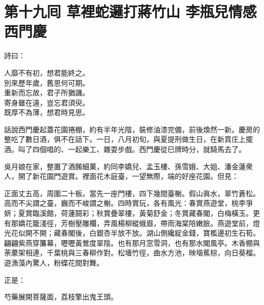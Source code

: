 
\chapter*{第十九囘 草裡蛇邏打蔣竹山 李瓶兒情感西門慶}


詩曰：

\begin{myquote}
人靡不有初，想君能終之。\\別來歷年歲，舊恩何可期。\\重新而忘故，君子所猶譏。\\寄身雖在遠，豈忘君須臾。\\既厚不為薄，想君時見思。
\end{myquote}

話說西門慶起蓋花園捲棚，約有半年光陰，裝修油漆完備，前後煥然一新。慶房的整吃了數日酒，俱不在話下。一日，八月初旬，與夏提刑做生日，在新買庄上擺酒。叫了四個唱的、一起樂工、雜耍步戲。西門慶從巳牌時分，就騎馬去了。

吳月娘在家，整置了酒餚細菓，約同李嬌兒、孟玉樓、孫雪娥、大姐、潘金蓮衆人，開了新花園門遊賞。裡面花木庭臺，一望無際，端的好座花園。但見：

\begin{myquote}
正面丈五高，周圍二十板。當先一座門樓，四下幾間臺榭。假山眞水，翠竹蒼松。高而不尖謂之臺，巍而不峻謂之榭。四時賞玩，各有風光：春賞燕遊堂，桃李爭妍；夏賞臨溪館，荷蓮鬪彩；秋賞疊翠樓，黃菊舒金；冬賞藏春閣，白梅橫玉。更有那嬌花籠淺徑，芳樹壓雕欄，弄風楊柳縱蛾眉，帶雨海棠陪嫩臉。燕遊堂前，燈光花似開不開；藏春閣後，白銀杏半放不放。湖山側纔綻金錢，寶檻邊初生石筍。翩翩紫燕穿簾幕，嚦嚦黃鶯度翠陰。也有那月窓雪洞，也有那水閣風亭。木香棚與荼䕷架相連，千葉桃與三春柳作對。松墻竹徑，曲水方池，映堦蕉棕，向日葵榴。遊漁藻內驚人，粉蝶花間對舞。

正是：

芍藥展開菩薩面，荔枝擎出鬼王頭。
\end{myquote}

